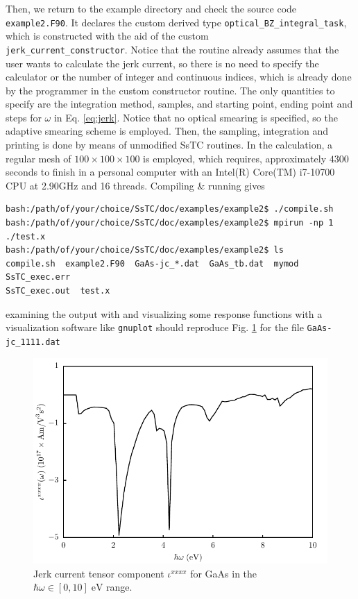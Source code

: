 \documentclass[10pt,a4paper]{article}
\begin{document}
Then, we return to the example directory and check the source code \verb|example2.F90|. It declares the custom derived type \verb|optical_BZ_integral_task|, which is constructed with the aid of the custom \\ \verb|jerk_current_constructor|. Notice that the routine already assumes that the user wants to calculate the jerk current, so there is no need to specify the calculator or the number of integer and continuous indices, which is already done by the programmer in the custom constructor routine. The only quantities to specify are the integration method, samples, and starting point, ending point and steps for $\omega$ in Eq. \eqref{eq:jerk}. Notice that no optical smearing is specified, so the adaptive smearing scheme \cite{yatesSpectralFermiSurface2007} is employed. Then, the sampling, integration and printing is done by means of unmodified SsTC routines. In the calculation, a regular mesh of $100\times 100 \times 100$ is employed, which requires, approximately $4300$ seconds to finish in a personal computer with an Intel(R) Core(TM) i7-10700 CPU at 2.90GHz and 16 threads. Compiling \& running gives
\begin{codebox}{}
\begin{verbatim}
bash:/path/of/your/choice/SsTC/doc/examples/example2$ ./compile.sh
bash:/path/of/your/choice/SsTC/doc/examples/example2$ mpirun -np 1 ./test.x
bash:/path/of/your/choice/SsTC/doc/examples/example2$ ls
compile.sh  example2.F90  GaAs-jc_*.dat  GaAs_tb.dat  mymod  SsTC_exec.err
SsTC_exec.out  test.x
\end{verbatim}
\end{codebox}
examining the output with and visualizing some response functions with a visualization software like \verb|gnuplot| should reproduce Fig. \ref{fig:GaAs_jc_xxxx} for the file \verb|GaAs-jc_1111.dat|
\begin{figure}
\centering
\includegraphics[width=\columnwidth]{jc/jc_GaAs_xxxx.pdf}
\caption{Jerk current tensor component $\iota^{xxxx}$ for GaAs in the $\hbar\omega\in[0, 10]\;\text{eV}$ range.}
\label{fig:GaAs_jc_xxxx}
\end{figure}
\end{document}
